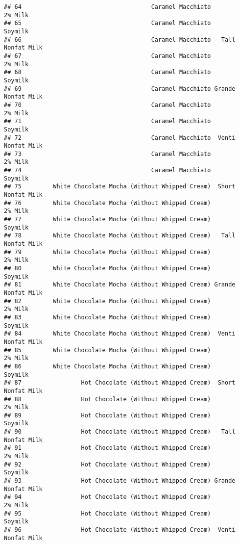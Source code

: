 \documentclass[
]{article}
\begin{document}
\begin{verbatim}
## 64                                     Caramel Macchiato            2% Milk
## 65                                     Caramel Macchiato            Soymilk
## 66                                     Caramel Macchiato   Tall Nonfat Milk
## 67                                     Caramel Macchiato            2% Milk
## 68                                     Caramel Macchiato            Soymilk
## 69                                     Caramel Macchiato Grande Nonfat Milk
## 70                                     Caramel Macchiato            2% Milk
## 71                                     Caramel Macchiato            Soymilk
## 72                                     Caramel Macchiato  Venti Nonfat Milk
## 73                                     Caramel Macchiato            2% Milk
## 74                                     Caramel Macchiato            Soymilk
## 75         White Chocolate Mocha (Without Whipped Cream)  Short Nonfat Milk
## 76         White Chocolate Mocha (Without Whipped Cream)            2% Milk
## 77         White Chocolate Mocha (Without Whipped Cream)            Soymilk
## 78         White Chocolate Mocha (Without Whipped Cream)   Tall Nonfat Milk
## 79         White Chocolate Mocha (Without Whipped Cream)            2% Milk
## 80         White Chocolate Mocha (Without Whipped Cream)            Soymilk
## 81         White Chocolate Mocha (Without Whipped Cream) Grande Nonfat Milk
## 82         White Chocolate Mocha (Without Whipped Cream)            2% Milk
## 83         White Chocolate Mocha (Without Whipped Cream)            Soymilk
## 84         White Chocolate Mocha (Without Whipped Cream)  Venti Nonfat Milk
## 85         White Chocolate Mocha (Without Whipped Cream)            2% Milk
## 86         White Chocolate Mocha (Without Whipped Cream)            Soymilk
## 87                 Hot Chocolate (Without Whipped Cream)  Short Nonfat Milk
## 88                 Hot Chocolate (Without Whipped Cream)            2% Milk
## 89                 Hot Chocolate (Without Whipped Cream)            Soymilk
## 90                 Hot Chocolate (Without Whipped Cream)   Tall Nonfat Milk
## 91                 Hot Chocolate (Without Whipped Cream)            2% Milk
## 92                 Hot Chocolate (Without Whipped Cream)            Soymilk
## 93                 Hot Chocolate (Without Whipped Cream) Grande Nonfat Milk
## 94                 Hot Chocolate (Without Whipped Cream)            2% Milk
## 95                 Hot Chocolate (Without Whipped Cream)            Soymilk
## 96                 Hot Chocolate (Without Whipped Cream)  Venti Nonfat Milk

\end{verbatim}
\end{document}
